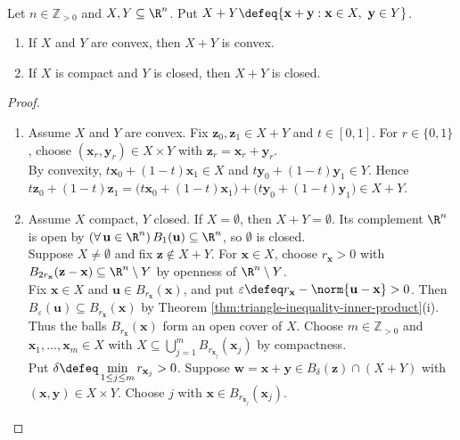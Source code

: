 \begin{proposition} \label{prop:minkowski-sum-convex-compact-closed} \\
Let $n\in\mathbb{Z}_{>0}$ and $X,Y\subseteq\R^n$. Put $X+Y\defeq\{\mathbf{x}+\mathbf{y}:\mathbf{x}\in X,\ \mathbf{y}\in Y\}$.
\begin{enumerate}[label=(\roman*)]
\setlength{\itemsep}{0pt}
\item If $X$ and $Y$ are convex, then $X+Y$ is convex.
\item If $X$ is compact and $Y$ is closed, then $X+Y$ is closed.
\end{enumerate}
\begin{proof}
\begin{enumerate}[label=(\roman*)]
\setlength{\itemsep}{0pt}
\item Assume $X$ and $Y$ are convex. Fix $\mathbf{z}_0,\mathbf{z}_1\in X+Y$ and $t\in[0,1]$. For $r\in\{0,1\}$, choose $(\mathbf{x}_r,\mathbf{y}_r)\in X\times Y$ with $\mathbf{z}_r=\mathbf{x}_r+\mathbf{y}_r$.\\
By convexity, $t\mathbf{x}_0+(1-t)\mathbf{x}_1\in X$ and $t\mathbf{y}_0+(1-t)\mathbf{y}_1\in Y$. Hence $t\mathbf{z}_0+(1-t)\mathbf{z}_1=\bigl(t\mathbf{x}_0+(1-t)\mathbf{x}_1\bigr)+\bigl(t\mathbf{y}_0+(1-t)\mathbf{y}_1\bigr)\in X+Y$.
\item Assume $X$ compact, $Y$ closed. If $X=\emptyset$, then $X+Y=\emptyset$. Its complement $\R^n$ is open by $(\forall\,\mathbf{u}\in\R^n)\,B_1(\mathbf{u})\subseteq\R^n$, so $\emptyset$ is closed.\\
Suppose $X\neq\emptyset$ and fix $\mathbf{z}\notin X+Y$. For $\mathbf{x}\in X$, choose $r_{\mathbf{x}}>0$ with $B_{2r_{\mathbf{x}}}(\mathbf{z}-\mathbf{x})\subseteq\R^n\setminus Y$ by openness of $\R^n\setminus Y$.\\
Fix $\mathbf{x}\in X$ and $\mathbf{u}\in B_{r_{\mathbf{x}}}(\mathbf{x})$, and put $\varepsilon\defeq r_{\mathbf{x}}-\norm{\mathbf{u}-\mathbf{x}}>0$. Then $B_\varepsilon(\mathbf{u})\subseteq B_{r_{\mathbf{x}}}(\mathbf{x})$ by Theorem \ref{thm:triangle-inequality-inner-product}(i).\\
Thus the balls $B_{r_{\mathbf{x}}}(\mathbf{x})$ form an open cover of $X$. Choose $m\in\mathbb{Z}_{>0}$ and $\mathbf{x}_1,\ldots,\mathbf{x}_m\in X$ with $X\subseteq\bigcup\limits_{j=1}^{m}B_{r_{\mathbf{x}_j}}(\mathbf{x}_j)$ by compactness.\\
Put $\delta\defeq\min\limits_{1\leq j\leq m}r_{\mathbf{x}_j}>0$. Suppose $\mathbf{w}=\mathbf{x}+\mathbf{y}\in B_\delta(\mathbf{z})\cap(X+Y)$ with $(\mathbf{x},\mathbf{y})\in X\times Y$. Choose $j$ with $\mathbf{x}\in B_{r_{\mathbf{x}_j}}(\mathbf{x}_j)$.\\

\end{enumerate}
\end{proof}
\end{proposition}
